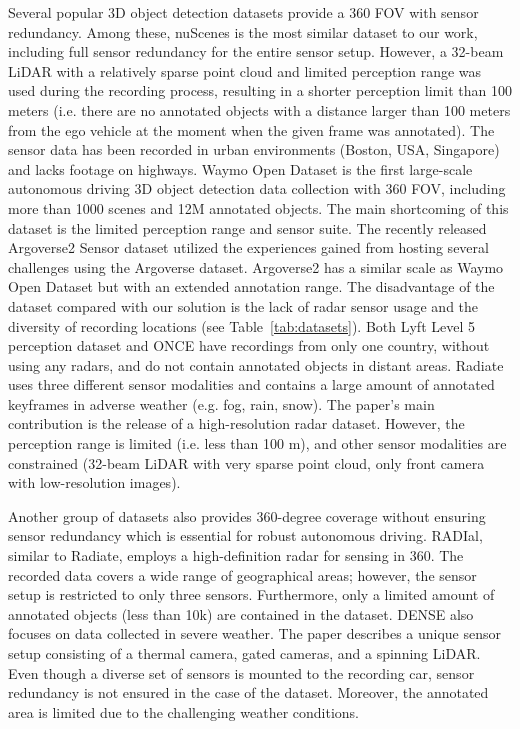 \documentclass{article}
\begin{document}
Several popular 3D object detection datasets provide a 360 FOV with sensor redundancy. Among these, nuScenes \citep{nuscenes} is the most similar dataset to our work, including full sensor redundancy for the entire sensor setup. However, a 32-beam LiDAR with a relatively sparse point cloud and limited perception range was used during the recording process, resulting in a shorter perception limit than 100 meters (i.e. there are no annotated objects with a distance larger than 100 meters from the ego vehicle at the moment when the given frame was annotated). The sensor data has been recorded in urban environments (Boston, USA, Singapore) and lacks footage on highways. Waymo Open Dataset\citep{waymo} is the first large-scale autonomous driving 3D object detection data collection with 360 FOV, including more than 1000 scenes and 12M annotated objects. The main shortcoming of this dataset is the limited perception range and sensor suite. The recently released Argoverse2 Sensor \citep{wilson2021argoverse} dataset utilized the experiences gained from hosting several challenges using the Argoverse \citep{argo} dataset. Argoverse2 has a similar scale as Waymo Open Dataset but with an extended annotation range. The disadvantage of the dataset compared with our solution is the lack of radar sensor usage and the diversity of recording locations (see Table~\ref{tab:datasets}). Both Lyft Level 5 perception dataset \citep{lyft} and ONCE \citep{mao2021one} have recordings from only one country, without using any radars, and do not contain annotated objects in distant areas. Radiate \citep{radiate} uses three different sensor modalities and contains a large amount of annotated keyframes in adverse weather (e.g. fog, rain, snow). The paper's main contribution is the release of a high-resolution radar dataset. However, the perception range is limited (i.e. less than 100 m), and other sensor modalities are constrained (32-beam LiDAR with very sparse point cloud, only front camera with low-resolution images).

Another group of datasets also provides 360-degree coverage without ensuring sensor redundancy which is essential for robust autonomous driving. RADIal\citep{radial}, similar to Radiate, employs a high-definition radar for sensing in 360. The recorded data covers a wide range of geographical areas; however, the sensor setup is restricted to only three sensors. Furthermore, only a limited amount of annotated objects (less than 10k) are contained in the dataset. DENSE \citep{dense} also focuses on data collected in severe weather. The paper describes a unique sensor setup consisting of a thermal camera, gated cameras, and a spinning LiDAR. Even though a diverse set of sensors is mounted to the recording car, sensor redundancy is not ensured in the case of the dataset. Moreover, the annotated area is limited due to the challenging weather conditions.
 
\end{document}
